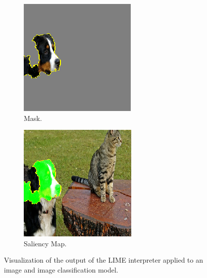 \begin{figure}[ht]
\begin{subfigure}{0.32\linewidth}
    \includegraphics[width=\linewidth]{figures/lime_dog_mask.png}
    \caption{Mask.}
    \label{fig:bird-a}
  \end{subfigure}
  \begin{subfigure}{0.32\linewidth}
    \includegraphics[width=\linewidth]{figures/lime_dog_map1.png}
    \caption{Saliency Map.}
    \label{fig:bird-a}
  \end{subfigure}
  \caption{Visualization of the output of the LIME interpreter applied to an image and image classification model.}\label{fig:lime_cat}
  \vspace{-0.3cm}
\end{figure}

